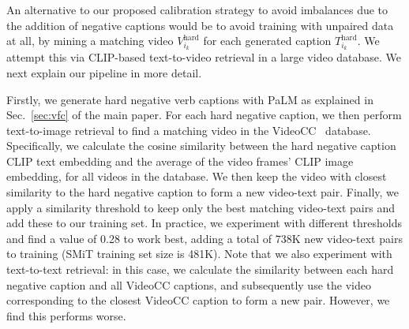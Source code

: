 \begin{table}
    \setlength{\tabcolsep}{8pt}
    \centering
        \vspace{0.2cm}
    \caption{
    \textbf{Video Mining.} We report multi-choice accuracy on Verb$_H$~\cite{park-etal-2022-exposing}, Kinetics-400 top-1 accuracy and V2T R@1 on Spoken Moment in Time (validation set of our pretraining SMiT data). We observe that although our Video Mining (VM) approach improves performance on Verb$_H$, it causes a drop in performance on Kinetics and SMiT, which highlights that the additional video-text pairs are noisy. For experiments including hard negatives, we note that one hard negative is sampled for each video here.}
    \label{tab:video-mining}
\end{table}

An alternative to our proposed calibration strategy to avoid imbalances due to the addition of negative captions would be to avoid training with unpaired data at all, by mining a matching video $V^{\text{hard}}_{i_k}$ for each generated caption $T^{\text{hard}}_{i_k}$. 
We attempt this via CLIP-based text-to-video retrieval in a large video database. We next explain our pipeline in more detail.

Firstly, we generate hard negative verb captions with PaLM as explained in Sec.~\ref{sec:vfc} of the main paper. For each hard negative caption, we then perform text-to-image retrieval to find a matching video in the VideoCC~\cite{nagrani2022learning} database. Specifically, we calculate the cosine similarity between the hard negative caption CLIP text embedding and the average of the video frames' CLIP image embedding, for all videos in the database. We then keep the video with closest similarity to the hard negative caption to form a new video-text pair.
Finally, we apply a similarity threshold to keep only the best matching video-text pairs and add these to our training set. In practice, we experiment with different thresholds and find a value of 0.28 to work best, adding a total of 738K new video-text pairs to training (SMiT training set size is 481K). Note that we also experiment with text-to-text retrieval: in this case, we calculate the similarity between each hard negative caption and all VideoCC captions, and subsequently use the video corresponding to the closest VideoCC caption to form a new pair. However, we find this performs worse.  

